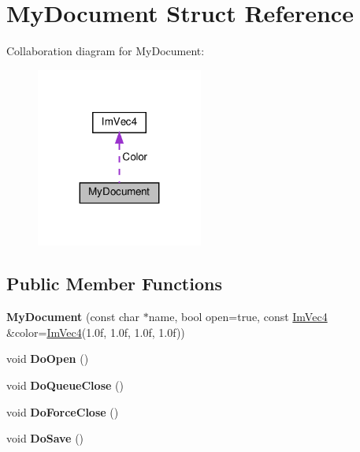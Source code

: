 \hypertarget{structMyDocument}{}\section{My\+Document Struct Reference}
\label{structMyDocument}


Collaboration diagram for My\+Document\+:\nopagebreak
\begin{figure}[H]
\begin{center}
\leavevmode
\includegraphics[width=155pt]{structMyDocument__coll__graph}
\end{center}
\end{figure}
\subsection*{Public Member Functions}
\begin{DoxyCompactItemize}
\item 
\mbox{\label{structMyDocument_a8fa9b646d5e545976cbbe06e010370bc}} 
{\bfseries My\+Document} (const char $\ast$name, bool open=true, const \hyperlink{structImVec4}{Im\+Vec4} \&color=\hyperlink{structImVec4}{Im\+Vec4}(1.\+0f, 1.\+0f, 1.\+0f, 1.\+0f))
\item 
\mbox{\label{structMyDocument_a43b510961f90f9fb83baa58bf2c771dc}} 
void {\bfseries Do\+Open} ()
\item 
\mbox{\label{structMyDocument_a2bfae8f35fd62dbad792c7b5d52059b9}} 
void {\bfseries Do\+Queue\+Close} ()
\item 
\mbox{\label{structMyDocument_ab204604930ba2489fb0f1ef2a53206a9}} 
void {\bfseries Do\+Force\+Close} ()
\item 
\mbox{\label{structMyDocument_a95b8cc478b59e5fc70a187e990506668}} 
void {\bfseries Do\+Save} ()
\end{DoxyCompactItemize}
